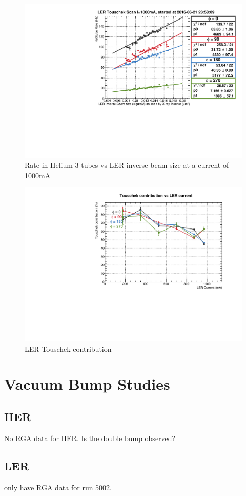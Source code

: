\begin{figure}[htb]
	\centerfloat
		\includegraphics[trim={0 0 0 0.75cm},clip, scale=0.6]{images/13010}
	\caption{Rate in Helium-3 tubes vs LER inverse beam size at a current of 1000mA}	
	\label{fig:TousLER13010}
\end{figure}

\begin{figure}[htb]
	\centerfloat
		\includegraphics[scale=0.6]{images/LER_beamSize2}
	\caption{LER Touschek contribution}	
	\label{fig:TousLERContrib}
\end{figure}


\clearpage

\section{Vacuum Bump Studies}



\subsection{HER}

	No RGA data for HER.
	Is the double bump observed?

\subsection{LER}

	only have RGA data for run 5002.
	


